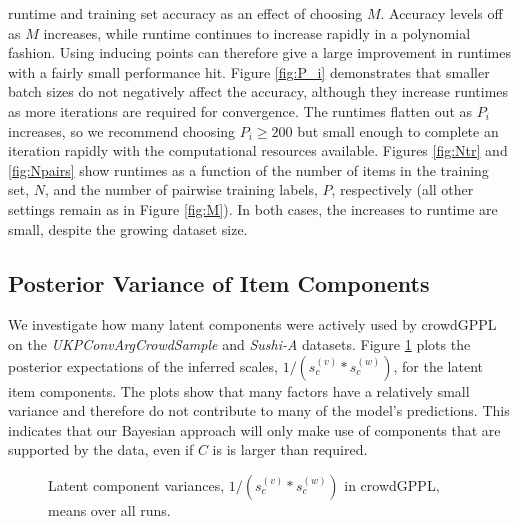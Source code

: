 runtime and training set accuracy as an effect of choosing $M$. 
Accuracy levels off as $M$ increases,
while runtime continues to increase rapidly in a polynomial fashion.
Using inducing points can therefore give a large improvement in runtimes 
with a fairly small performance hit.
Figure \ref{fig:P_i} demonstrates that
smaller batch sizes do not negatively affect the accuracy,
although they increase runtimes as more iterations are required for convergence.
The runtimes flatten out as $P_i$ increases, so we recommend choosing $P_i\geq 200$
but small enough to complete an iteration rapidly with the computational resources available.
Figures \ref{fig:Ntr} and \ref{fig:Npairs} show runtimes as a
function of the number of items in the training set, $N$,
and the number of pairwise training labels, $P$, respectively (all other settings remain as in Figure \ref{fig:M}).
In both cases, the increases to runtime are small, despite the growing dataset size.

\subsection{Posterior Variance of Item Components}
\label{sec:components}

We investigate how many latent components were actively used by 
 crowdGPPL on the \emph{UKPConvArgCrowdSample} and \emph{Sushi-A} datasets.
Figure \ref{fig:latent_factor_variance}
plots the posterior expectations of the inferred scales, $1/(s^{(v)}_c * s^{(w)}_c)$, for the latent item 
 components. 
 The plots show
that many factors have a relatively small variance and therefore do not contribute 
to many of the model's predictions. This indicates that 
our Bayesian approach will only make use of components that are supported by the data, 
even if $C$ is is larger than required.
\begin{figure}[h]
\centering
{}
\caption{
Latent component variances, $1/(s^{(v)}_c * s^{(w)}_c)$ in crowdGPPL, means over all runs.
}
\label{fig:latent_factor_variance}
\end{figure}
